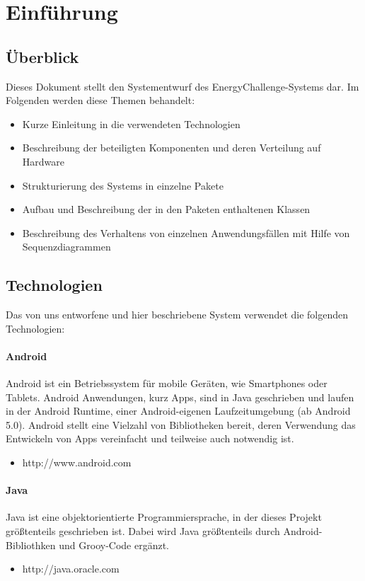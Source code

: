 \section{Einführung}
\subsection{Überblick}
Dieses Dokument stellt den Systementwurf des EnergyChallenge-Systems dar. Im Folgenden werden diese Themen behandelt:
\begin{itemize}
\item Kurze Einleitung in die verwendeten Technologien
\item Beschreibung der beteiligten Komponenten und deren Verteilung auf Hardware
\item Strukturierung des Systems in einzelne Pakete
\item Aufbau und Beschreibung der in den Paketen enthaltenen Klassen
\item Beschreibung des Verhaltens von einzelnen Anwendungsf\"allen mit Hilfe von Sequenzdiagrammen
\end{itemize}
\subsection{Technologien}
Das von uns entworfene und hier beschriebene System verwendet die folgenden Technologien:
\paragraph{Android}
Android ist ein Betriebssystem für mobile Ger\"aten, wie Smartphones oder Tablets. Android Anwendungen, kurz Apps, sind in Java geschrieben und laufen in der Android Runtime, einer Android-eigenen Laufzeitumgebung (ab Android 5.0). Android stellt eine Vielzahl von Bibliotheken bereit, deren Verwendung das Entwickeln von Apps vereinfacht und teilweise auch notwendig ist.
\begin{itemize}
\item http://www.android.com
\end{itemize}

\paragraph{Java}
Java ist eine objektorientierte Programmiersprache, in der dieses Projekt größtenteils geschrieben ist. Dabei wird Java größtenteils durch Android-Bibliothken und Grooy-Code ergänzt.
\begin{itemize}
\item http://java.oracle.com
\end{itemize}

